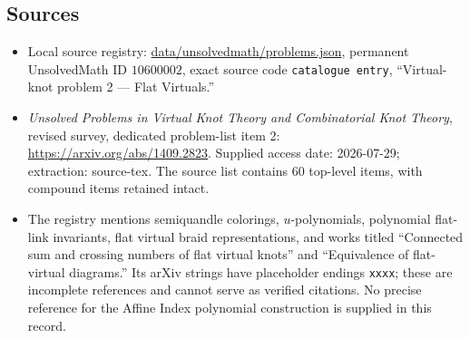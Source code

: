 \documentclass[11pt]{article}
\begin{document}
\subsection{Sources}
\begin{itemize}
\item Local source registry: \url{data/unsolvedmath/problems.json}, permanent UnsolvedMath ID $10600002$, exact source code \texttt{catalogue entry}, ``Virtual-knot problem 2 --- Flat Virtuals.''
\item \emph{Unsolved Problems in Virtual Knot Theory and Combinatorial Knot Theory}, revised survey, dedicated problem-list item 2: \url{https://arxiv.org/abs/1409.2823}. Supplied access date: 2026-07-29; extraction: source-tex. The source list contains 60 top-level items, with compound items retained intact.
\item The registry mentions semiquandle colorings, $u$-polynomials, polynomial flat-link invariants, flat virtual braid representations, and works titled ``Connected sum and crossing numbers of flat virtual knots'' and ``Equivalence of flat-virtual diagrams.'' Its arXiv strings have placeholder endings \texttt{xxxx}; these are incomplete references and cannot serve as verified citations. No precise reference for the Affine Index polynomial construction is supplied in this record.
\end{itemize}
\end{document}
